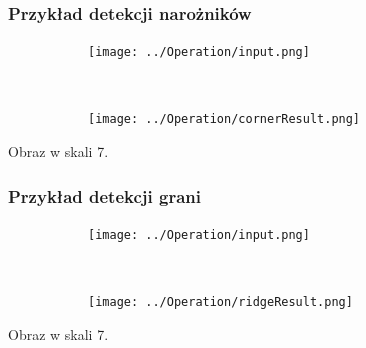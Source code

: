 \begin{frame}
	\frametitle{Przykład detekcji narożników}
	\begin{figure}[h]
		\begin{center}

			\begin{subfigure}[b]{5cm}
				\centering
				\texttt{[image: ../Operation/input.png]}
			\end{subfigure}~
			\begin{subfigure}[b]{5cm}
				\centering
				\texttt{[image: ../Operation/cornerResult.png]}
			\end{subfigure}
			\end{center}
	\end{figure}
	
	Obraz w skali 7.
\end{frame}
\begin{frame}
	\frametitle{Przykład detekcji grani}
	\begin{figure}[h]
		\begin{center}

			\begin{subfigure}[b]{5cm}
				\centering
				\texttt{[image: ../Operation/input.png]}
			\end{subfigure}~
			\begin{subfigure}[b]{5cm}
				\centering
				\texttt{[image: ../Operation/ridgeResult.png]}
			\end{subfigure}
			\label{fig:wynik}
		\end{center}
	\end{figure}
	
	Obraz w skali 7.

\end{frame}
